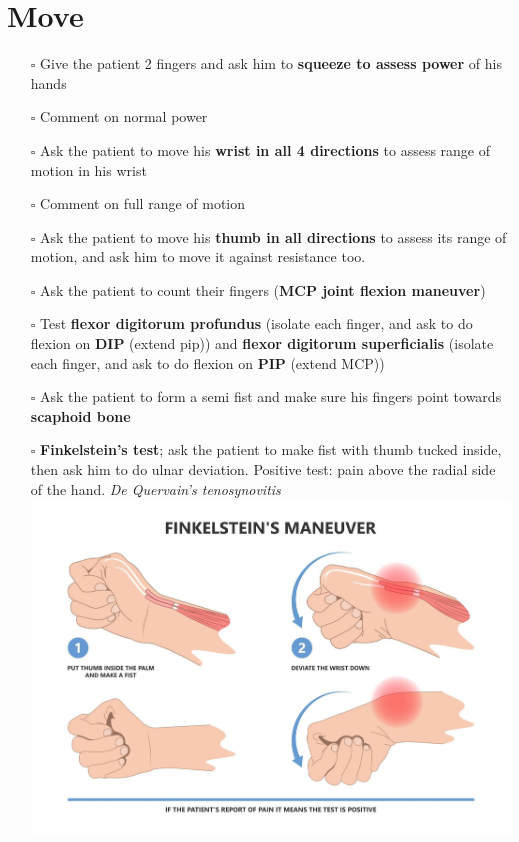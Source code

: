 \documentclass[
  13.5pt,
  a4paper,
  DIV=11,
  numbers=noendperiod]{scrreprt}
\providecommand{\tightlist}{%
  \setlength{\itemsep}{0pt}\setlength{\parskip}{0pt}}
\begin{document}
\chapter{Move}\label{move}

\begin{itemize}
\tightlist
\item[$\square$]
  Give the patient 2 fingers and ask him to \textbf{squeeze to assess
  power} of his hands
\item[$\square$]
  Comment on normal power
\item[$\square$]
  Ask the patient to move his \textbf{wrist in all 4 directions} to
  assess range of motion in his wrist
\item[$\square$]
  Comment on full range of motion
\item[$\square$]
  Ask the patient to move his \textbf{thumb in all directions} to assess
  its range of motion, and ask him to move it against resistance too.
\item[$\square$]
  Ask the patient to count their fingers (\textbf{MCP joint flexion
  maneuver})
\item[$\square$]
  Test \textbf{flexor digitorum profundus} (isolate each finger, and ask
  to do flexion on \textbf{DIP} (extend pip)) and \textbf{flexor
  digitorum superficialis} (isolate each finger, and ask to do flexion
  on \textbf{PIP} (extend MCP))
\item[$\square$]
  Ask the patient to form a semi fist and make sure his fingers point
  towards \textbf{scaphoid bone}
\item[$\square$]
  \textbf{Finkelstein's test}; ask the patient to make fist with thumb
  tucked inside, then ask him to do ulnar deviation. Positive test: pain
  above the radial side of the hand. \emph{De Quervain's tenosynovitis}
  \includegraphics[width=5.20833in,height=3.48958in]{mss0.png}
\end{itemize}
\end{document}
